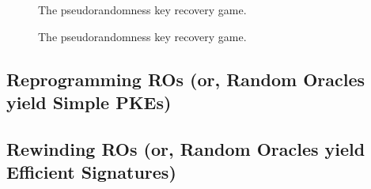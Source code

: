     \begin{figure}[t]
      \centering
      \begin{pchstack}

        \pchspace

      \end{pchstack}
      \caption{
        The pseudorandomness key recovery game.
      }
    \label{fig:prf-ku}
    \end{figure}

    \begin{figure}[t]
      \centering
      \begin{pchstack}

        \pchspace

      \end{pchstack}
      \caption{
        The pseudorandomness key recovery game.
      }
    \label{fig:prf-ku}
    \end{figure}

  \subsection{Reprogramming ROs (or, Random Oracles yield Simple PKEs)}

  \subsection{Rewinding ROs (or, Random Oracles yield Efficient Signatures)}
